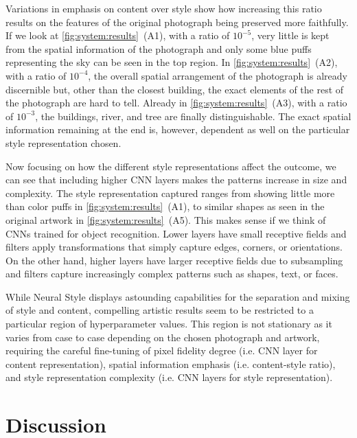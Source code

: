 Variations in emphasis on content over style show how increasing this ratio results on the features of the original photograph being preserved more faithfully.
If we look at \autoref{fig:system:results}~(A1), with a ratio of $10^{-5}$, very little is kept from the spatial information of the photograph and only some blue puffs representing the sky can be seen in the top region.
In \autoref{fig:system:results}~(A2), with a ratio of $10^{-4}$, the overall spatial arrangement of the photograph is already discernible but, other than the closest building, the exact elements of the rest of the photograph are hard to tell.
Already in \autoref{fig:system:results}~(A3), with a ratio of $10^{-3}$, the buildings, river, and tree are finally distinguishable.
The exact spatial information remaining at the end is, however, dependent as well on the particular style representation chosen.

Now focusing on how the different style representations affect the outcome, we can see that including higher CNN layers makes the patterns increase in size and complexity.
The style representation captured ranges from showing little more than color puffs in \autoref{fig:system:results}~(A1), to similar shapes as seen in the original artwork in \autoref{fig:system:results}~(A5).
This makes sense if we think of CNNs trained for object recognition.
Lower layers have small receptive fields and filters apply transformations that simply capture edges, corners, or orientations.
On the other hand, higher layers have larger receptive fields due to subsampling and filters capture increasingly complex patterns such as shapes, text, or faces.

While Neural Style displays astounding capabilities for the separation and mixing of style and content, compelling artistic results seem to be restricted to a particular region of hyperparameter values.
This region is not stationary as it varies from case to case depending on the chosen photograph and artwork, requiring the careful fine-tuning of pixel fidelity degree (i.e. CNN layer for content representation), spatial information emphasis (i.e. content-style ratio), and style representation complexity (i.e. CNN layers for style representation).



\section{Discussion}
\label{sec:system:discussion}

